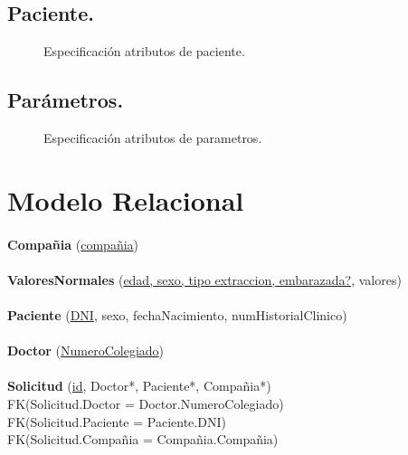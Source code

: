 \documentclass[a4paper,10pt]{article}
\newcommand\tab[1][1cm]{\hspace*{#1}}
\begin{document}
\subsection{Paciente.}
\begin{figure}[hbt]
	\begin{center}
		\scalebox{0.5}{}
	\end{center}
	\caption{Especificación atributos de paciente.}
	\label{fig:spec_paciente}
\end{figure}
\subsection{Parámetros.}
\begin{figure}[hbt]
	\begin{center}
		\scalebox{0.5}{}
	\end{center}
	\caption{Especificación atributos de parametros.}
	\label{fig:spec_parametros}
\end{figure}

\pagebreak
\section{Modelo Relacional}

\paragraph{}
{\bf Compañia} (\underline{compañia})

\paragraph{}
{\bf ValoresNormales} (\underline{edad, sexo, tipo extraccion, embarazada?}, valores)

\paragraph{}
{\bf Paciente} (\underline{DNI}, sexo, fechaNacimiento, numHistorialClinico)

\paragraph{}
{\bf Doctor} (\underline{NumeroColegiado})

\paragraph{}
{\bf Solicitud} (\underline{id}, Doctor*, Paciente*, Compañia*)\\
\tab FK(Solicitud.Doctor = Doctor.NumeroColegiado)\\
\tab FK(Solicitud.Paciente = Paciente.DNI)\\
\tab FK(Solicitud.Compañia = Compañia.Compañia)
\end{document}
